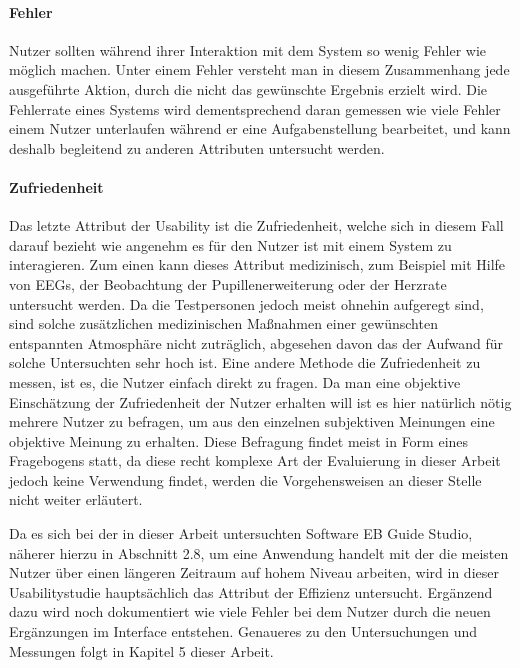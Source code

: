 \paragraph{Fehler}
Nutzer sollten während ihrer Interaktion mit dem System so wenig Fehler wie möglich machen. 
Unter einem Fehler versteht man in diesem Zusammenhang jede ausgeführte Aktion, durch die nicht das gewünschte Ergebnis erzielt wird.
Die Fehlerrate eines Systems wird dementsprechend daran gemessen wie viele Fehler einem Nutzer unterlaufen während er eine Aufgabenstellung bearbeitet, und kann deshalb begleitend zu anderen Attributen untersucht werden\cite{Nielsen.1995?}.

\paragraph{Zufriedenheit}
Das letzte Attribut der Usability ist die Zufriedenheit, welche sich in diesem Fall darauf bezieht wie angenehm es für den Nutzer ist mit einem System zu interagieren.
Zum einen kann dieses Attribut medizinisch, zum Beispiel mit Hilfe von EEGs, der Beobachtung der Pupillenerweiterung oder der Herzrate untersucht werden.
Da die Testpersonen jedoch meist ohnehin aufgeregt sind, sind solche zusätzlichen medizinischen Maßnahmen einer gewünschten entspannten Atmosphäre nicht zuträglich, abgesehen davon das der Aufwand für solche Untersuchten sehr hoch ist.
Eine andere Methode die Zufriedenheit zu messen, ist es, die Nutzer einfach direkt zu fragen.
Da man eine objektive Einschätzung der Zufriedenheit der Nutzer erhalten will ist es hier natürlich nötig mehrere Nutzer zu befragen, um aus den einzelnen subjektiven Meinungen eine objektive Meinung zu erhalten\cite{Nielsen.1995?}.
Diese Befragung findet meist in Form eines Fragebogens statt, da diese recht komplexe Art der Evaluierung in dieser Arbeit jedoch keine Verwendung findet, werden die Vorgehensweisen an dieser Stelle nicht weiter erläutert.

Da es sich bei der in dieser Arbeit untersuchten Software EB Guide Studio, näherer hierzu in Abschnitt 2.8, um eine Anwendung handelt mit der die meisten Nutzer über einen längeren Zeitraum auf hohem Niveau arbeiten, wird in dieser Usabilitystudie hauptsächlich das Attribut der Effizienz untersucht. Ergänzend dazu wird noch dokumentiert wie viele Fehler bei dem Nutzer durch die neuen Ergänzungen im Interface entstehen. Genaueres zu den Untersuchungen und Messungen folgt in Kapitel 5 dieser Arbeit.

